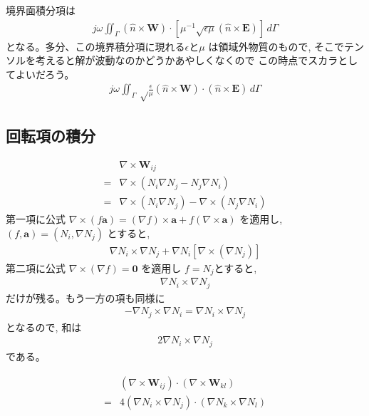 境界面積分項は
\begin{align}
j\omega\iint_\Gamma
\left(\hat{n}\times\bm{W}\right)\cdot
\left[\mu^{-1}
\sqrt{\epsilon\mu}\left(\hat{n}\times\bm{E}\right)
\right]\,d\Gamma
\end{align}
となる。多分、この境界積分項に現れる$\epsilon$と$\mu$
は領域外物質のもので,
そこでテンソルを考えると解が波動なのかどうかあやしくなくので%
この時点でスカラとしてよいだろう。
\begin{align}
j\omega\iint_\Gamma\sqrt\frac{\epsilon}{\mu}
\left(\hat{n}\times\bm{W}\right)\cdot
\left(\hat{n}\times\bm{E}\right)
\,d\Gamma
\end{align}

\subsection{回転項の積分}

\begin{align}
&\nabla\times\bm{W}_{ij}\\
=&\nabla\times\left(N_i\nabla N_j-N_j\nabla N_i\right)\\
=&\nabla\times\left(N_i\nabla N_j\right)
 -\nabla\times\left(N_j\nabla N_i\right)
\end{align}
第一項に公式
$\nabla\times\left(f\bm{a}\right)
=\left(\nabla f\right)\times\bm{a}
+f\left(\nabla\times\bm{a}\right)$
を適用し,
$\left(f, \bm{a}\right)
=\left(N_i, \nabla N_j\right)$
とすると,
\begin{align}
\nabla N_i\times\nabla N_j
+\nabla N_i\left[\nabla\times\left(\nabla N_j\right)\right]
\end{align}
第二項に公式
$\nabla\times\left(\nabla f\right)=\bm{0}$
を適用し
$f=N_j$とすると,
\begin{align}
\nabla N_i\times\nabla N_j
\end{align}
だけが残る。もう一方の項も同様に
\begin{align}
-\nabla N_j\times\nabla N_i = \nabla N_i\times\nabla N_j
\end{align}
となるので, 和は
\begin{align}
2\nabla N_i\times\nabla N_j
\end{align}
である。

\begin{align}
&\left(\nabla\times\bm{W}_{ij}\right)\cdot
\left(\nabla\times\bm{W}_{kl}\right)\\
=&4\left(\nabla N_i\times\nabla N_j\right)\cdot
   \left(\nabla N_k\times\nabla N_l\right)
\end{align}

